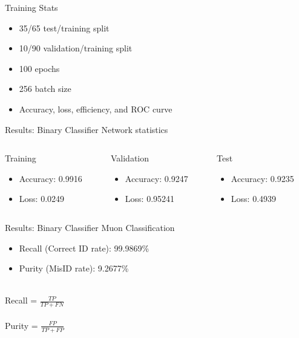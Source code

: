 \documentclass[10pt,handout]{beamer}
\begin{document}
\begin{frame}{Training Stats}
\begin{itemize}
\item 35/65 test/training split
\item 10/90 validation/training split
\item 100 epochs
\item 256 batch size
\item Accuracy, loss, efficiency, and ROC curve
\end{itemize}
\end{frame}


\begin{frame}{Results: Binary Classifier}
Network statistics \\
\quad \quad
\begin{columns}
\begin{column}{0.3\textwidth}
Training
\begin{itemize}
\small
\item Accuracy: 0.9916
\item Loss: 0.0249
\end{itemize}
\end{column}
\begin{column}{0.3\textwidth}
Validation
\begin{itemize}
\small
\item Accuracy: 0.9247
\item Loss: 0.95241
\end{itemize}
\end{column}
\begin{column}{0.3\textwidth}
Test
\begin{itemize}
\small
\item Accuracy: 0.9235
\item Loss: 0.4939
\end{itemize}
\end{column}
\end{columns}
\end{frame}


\begin{frame}{Results: Binary Classifier}
Muon Classification \\
\quad \quad
\begin{itemize}
\item Recall (Correct ID rate): 99.9869\%
\item Purity (MisID rate): 9.2677\%
\end{itemize}
\quad \quad \\
Recall = $\frac{TP}{TP+FN}$ \\
\quad \\
Purity = $\frac{FP}{TP+FP}$
\end{frame}
\end{document}
